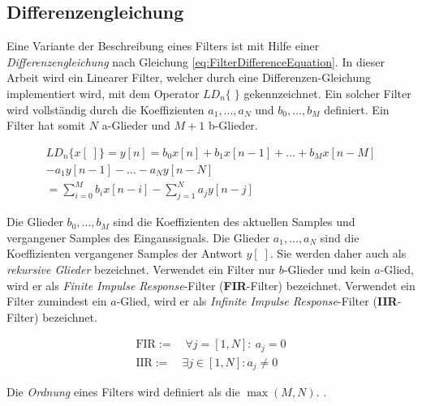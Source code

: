 \subsection{Differenzengleichung}
\label{sec:differenzengleichung}

Eine Variante der Beschreibung eines Filters ist mit Hilfe einer \emph{Differenzengleichung} nach Gleichung \ref{eq:FilterDifferenceEquation}. In dieser Arbeit wird ein Linearer Filter, welcher durch eine Differenzen-Gleichung implementiert wird, mit dem Operator $LD_n\{\;\}$ gekennzeichnet. Ein solcher Filter wird vollständig durch die Koeffizienten $a_1 ,\ldots, a_N$ und $b_0 ,\ldots, b_M$  definiert. Ein Filter hat somit $N$ a-Glieder und $M+1$ b-Glieder.  \cite[\glqq Difference Equation\grqq]{introductionToFilters}

 \begin{equation}
\begin{split}
LD_n\{x[\;]\}= y[n] = b_0 x[n] + b_1 x[n-1] + \ldots +b_M x[n-M] \\
- a_1 y[n-1] - \ldots - a_N y[n-N] \\
 = \sum_{i=0}^{M} b_i x[n-i] - \sum_{j=1}^{N} a_j y[n-j]
\end{split}
\label{eq:FilterDifferenceEquation}
\end{equation}

Die Glieder $b_0 ,\ldots, b_M$ sind die Koeffizienten des aktuellen Samples und vergangener Samples des Einganssignals. Die Glieder $a_1 ,\ldots, a_N$ sind die Koeffizienten vergangener Samples der Antwort $y[\;]$. Sie werden daher auch als \emph{rekursive Glieder} bezeichnet. Verwendet ein Filter nur $b$-Glieder und kein $a$-Glied, wird er als \emph{Finite Impulse Response}-Filter (\textbf{FIR}-Filter) bezeichnet. Verwendet ein Filter zumindest ein $a$-Glied, wird er als \emph{Infinite Impulse Response}-Filter (\textbf{IIR}-Filter) bezeichnet.\cite[\glqq Difference Equation\grqq]{introductionToFilters}

 \begin{equation}
\begin{gathered}
\text{FIR} := \quad \forall j = [1,N] :\ a_j = 0 \\
\text{IIR} := \quad \exists j \in [1,N]:  a_j \neq 0
\end{gathered}
\label{eq:FilterDifferenceEquation}
\end{equation}

Die \emph{Ordnung} eines Filters wird definiert als die $\max(M,N)$. \cite[\glqq Filter Order\grqq]{introductionToFilters}.

